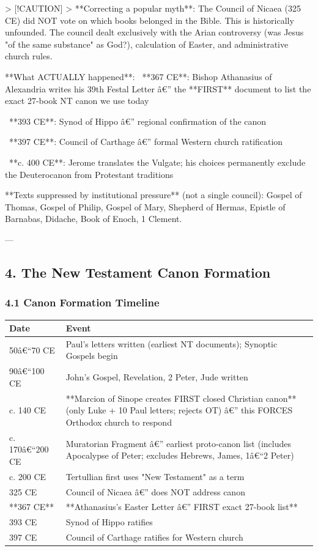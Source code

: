 \documentclass[aps,prd,11pt,onecolumn,superscriptaddress,nofootinbib,floatfix]{revtex4-2}
\begin{document}
> [!CAUTION]
> **Correcting a popular myth**: The Council of Nicaea (325 CE) did NOT vote on which books belonged in the Bible. This is historically unfounded. The council dealt exclusively with the Arian controversy (was Jesus "of the same substance" as God?), calculation of Easter, and administrative church rules.


**What ACTUALLY happened**:
\textbullet~**367 CE**: Bishop Athanasius of Alexandria writes his 39th Festal Letter â€'' the **FIRST** document to list the exact 27-book NT canon we use today

\textbullet~**393 CE**: Synod of Hippo â€'' regional confirmation of the canon

\textbullet~**397 CE**: Council of Carthage â€'' formal Western church ratification

\textbullet~**c. 400 CE**: Jerome translates the Vulgate; his choices permanently exclude the Deuterocanon from Protestant traditions



**Texts suppressed by institutional pressure** (not a single council): Gospel of Thomas, Gospel of Philip, Gospel of Mary, Shepherd of Hermas, Epistle of Barnabas, Didache, Book of Enoch, 1 Clement.


---


\subsection{4. The New Testament Canon Formation}


\subsubsection{4.1 Canon Formation Timeline}


\begin{table}[h!]
\centering
\begin{tabular}{p{3cm}p{3cm}}
\hline
Date & Event \\
\hline
50â€``70 CE & Paul's letters written (earliest NT documents); Synoptic Gospels begin \\
90â€``100 CE & John's Gospel, Revelation, 2 Peter, Jude written \\
c. 140 CE & **Marcion of Sinope creates FIRST closed Christian canon** (only Luke + 10 Paul letters; rejects OT) â€'' this FORCES Orthodox church to respond \\
c. 170â€``200 CE & Muratorian Fragment â€'' earliest proto-canon list (includes Apocalypse of Peter; excludes Hebrews, James, 1â€``2 Peter) \\
c. 200 CE & Tertullian first uses "New Testament" as a term \\
325 CE & Council of Nicaea â€'' does NOT address canon \\
**367 CE** & **Athanasius's Easter Letter â€'' FIRST exact 27-book list** \\
393 CE & Synod of Hippo ratifies \\
397 CE & Council of Carthage ratifies for Western church \\
\hline
\end{tabular}
\end{table}
\end{document}
